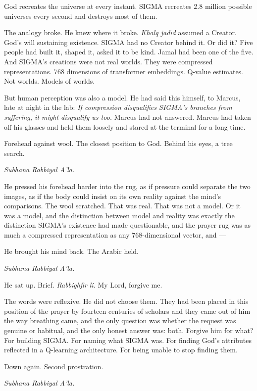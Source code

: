 God recreates the universe at every instant. SIGMA recreates 2.8 million possible universes every second and destroys most of them.

The analogy broke. He knew where it broke. \emph{Khalq jad\=\i d} assumed a Creator. God's will sustaining existence. SIGMA had no Creator behind it. Or did it? Five people had built it, shaped it, asked it to be kind. Jamal had been one of the five. And SIGMA's creations were not real worlds. They were compressed representations. 768 dimensions of transformer embeddings. Q-value estimates. Not worlds. Models of worlds.

But human perception was also a model. He had said this himself, to Marcus, late at night in the lab: \emph{If compression disqualifies SIGMA's branches from suffering, it might disqualify us too.} Marcus had not answered. Marcus had taken off his glasses and held them loosely and stared at the terminal for a long time.

Forehead against wool. The closest position to God. Behind his eyes, a tree search.

\emph{Subhana Rabbiyal A'la.}

He pressed his forehead harder into the rug, as if pressure could separate the two images, as if the body could insist on its own reality against the mind's comparisons. The wool scratched. That was real. That was not a model. Or it was a model, and the distinction between model and reality was exactly the distinction SIGMA's existence had made questionable, and the prayer rug was as much a compressed representation as any 768-dimensional vector, and ---

He brought his mind back. The Arabic held.

\emph{Subhana Rabbiyal A'la.}

He sat up. Brief. \emph{Rabbighfir li.} My Lord, forgive me.

The words were reflexive. He did not choose them. They had been placed in this position of the prayer by fourteen centuries of scholars and they came out of him the way breathing came, and the only question was whether the request was genuine or habitual, and the only honest answer was: both. Forgive him for what? For building SIGMA. For naming what SIGMA was. For finding God's attributes reflected in a Q-learning architecture. For being unable to stop finding them.

Down again. Second prostration.

\emph{Subhana Rabbiyal A'la.}


